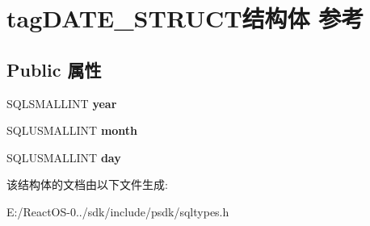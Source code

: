 \hypertarget{structtag_d_a_t_e___s_t_r_u_c_t}{}\section{tag\+D\+A\+T\+E\+\_\+\+S\+T\+R\+U\+C\+T结构体 参考}
\label{structtag_d_a_t_e___s_t_r_u_c_t}
\subsection*{Public 属性}
\begin{DoxyCompactItemize}
\item 
\mbox{\label{structtag_d_a_t_e___s_t_r_u_c_t_a6017663bd4dfaa645f243a3dbddf5d65}} 
S\+Q\+L\+S\+M\+A\+L\+L\+I\+NT {\bfseries year}
\item 
\mbox{\label{structtag_d_a_t_e___s_t_r_u_c_t_aaeba43f00c1b8fcbc0125955edc958ef}} 
S\+Q\+L\+U\+S\+M\+A\+L\+L\+I\+NT {\bfseries month}
\item 
\mbox{\label{structtag_d_a_t_e___s_t_r_u_c_t_a66d873dbe600c3a6fe18f3ba34384ee7}} 
S\+Q\+L\+U\+S\+M\+A\+L\+L\+I\+NT {\bfseries day}
\end{DoxyCompactItemize}


该结构体的文档由以下文件生成\+:\begin{DoxyCompactItemize}
\item 
E\+:/\+React\+O\+S-\/0../sdk/include/psdk/sqltypes.\+h\end{DoxyCompactItemize}
